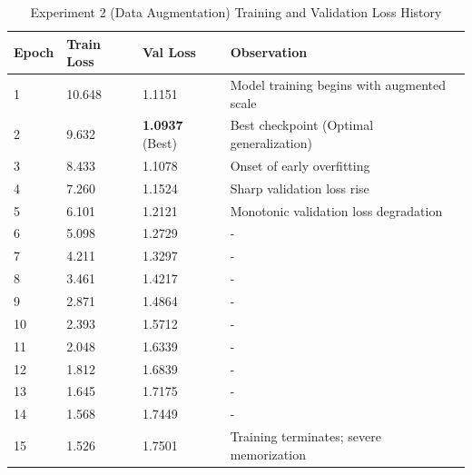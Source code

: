 \documentclass[12pt, conference, letterpaper]{IEEEtran}
\begin{document}
\begin{table}[h]
    \caption{Experiment 2 (Data Augmentation) Training and Validation Loss History}
    \label{tab:qwen_loss_history_augmented}
    \centering
    \footnotesize
    \begin{tabular}{lllp{2.4cm}}
        \toprule
        \textbf{Epoch} & \textbf{Train Loss} & \textbf{Val Loss}      & \textbf{Observation}                       \\ \midrule
        1              & 10.648              & 1.1151                 & Model training begins with augmented scale \\
        2              & 9.632               & \textbf{1.0937} (Best) & Best checkpoint (Optimal generalization)   \\
        3              & 8.433               & 1.1078                 & Onset of early overfitting                 \\
        4              & 7.260               & 1.1524                 & Sharp validation loss rise                 \\
        5              & 6.101               & 1.2121                 & Monotonic validation loss degradation      \\
        6              & 5.098               & 1.2729                 & -                                          \\
        7              & 4.211               & 1.3297                 & -                                          \\
        8              & 3.461               & 1.4217                 & -                                          \\
        9              & 2.871               & 1.4864                 & -                                          \\
        10             & 2.393               & 1.5712                 & -                                          \\
        11             & 2.048               & 1.6339                 & -                                          \\
        12             & 1.812               & 1.6839                 & -                                          \\
        13             & 1.645               & 1.7175                 & -                                          \\
        14             & 1.568               & 1.7449                 & -                                          \\
        15             & 1.526               & 1.7501                 & Training terminates; severe memorization   \\
        \bottomrule
    \end{tabular}
\end{table}
\end{document}

